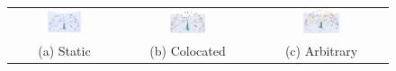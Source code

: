 \begingroup
\begin{figure}[!htb]
    \centering
    \begin{tabular*}{\textwidth}{ c c c }
          \includegraphics[width=0.32\textwidth]{figures/light_settings/static_setting.png}
        & \includegraphics[width=0.29\textwidth]{figures/light_settings/colocated_setting.png}
        & \includegraphics[width=0.29\textwidth]{figures/light_settings/arbitrary_setting.png} \\
        (a) Static & (b) Colocated & (c) Arbitrary
    \end{tabular*}
    \caption{}
    \label{fig:light_settings}
\end{figure}
\endgroup